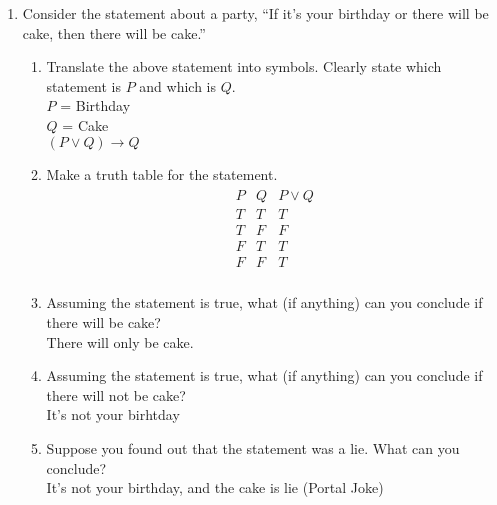 \documentclass[11pt,a4paper]{article}
\begin{document}
    \begin{enumerate}

        \item Consider the statement about a party, “If it’s your birthday or there will be cake, then there will be cake.”
            \begin{enumerate}
                \item Translate the above statement into symbols. Clearly state which statement is $P$ and which is $Q$.\\
                    $P$ = Birthday \\$Q$ = Cake\\$(P\lor Q) \rightarrow Q$
                \item Make a truth table for the statement.
                        \begin{align*} 
                            \begin{array}{|c|c|c|} 
                            P & Q & P \lor  Q\\ 
                            \hline          
                            T & T & T\\
                            T & F & F\\
                            F & T & T\\
                            F & F & T\\
                            \end{array}
                        \end{align*}

                \item Assuming the statement is true, what (if anything) can you conclude if there will be cake?\\
                   There will only be cake. 
                \item Assuming the statement is true, what (if anything) can you conclude if there will not be cake?\\
                    It's not your birhtday
                \item Suppose you found out that the statement was a lie. What can you conclude?\\
                    It's not your birthday, and the cake is lie (Portal Joke)
            \end{enumerate}


\end{enumerate}
\end{document}
